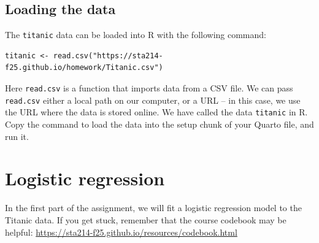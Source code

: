\documentclass[11pt]{article}
\begin{document}
\subsection*{Loading the data}

The \verb;titanic; data can be loaded into R with the following command:

\begin{verbatim}
titanic <- read.csv("https://sta214-f25.github.io/homework/Titanic.csv")
\end{verbatim}

\noindent Here \texttt{read.csv} is a function that imports data from a CSV file. We can pass \texttt{read.csv} either a local path on our computer, or a URL -- in this case, we use the URL where the data is stored online. We have called the data \verb;titanic; in R.\\

\noindent Copy the command to load the data into the setup chunk of your Quarto file, and run it.

\newpage

\section{Logistic regression}

In the first part of the assignment, we will fit a logistic regression model to the Titanic data. If you get stuck, remember that the course codebook may be helpful: \url{https://sta214-f25.github.io/resources/codebook.html} 
\end{document}
